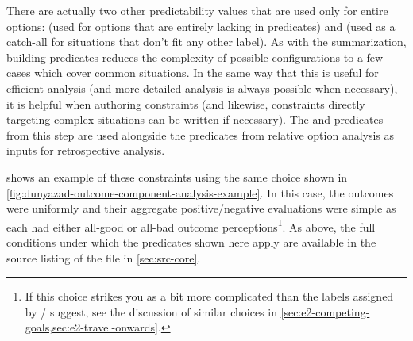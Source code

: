 \begin{enumerate}[leftmargin=1.4em]
There are actually two other predictability values that are used only for entire options:  (used for options that are entirely lacking in  predicates) and  (used as a catch-all for situations that don't fit any other label).
%
As with the  summarization, building  predicates reduces the complexity of possible  configurations to a few cases which cover common situations.
%
In the same way that this is useful for efficient analysis (and more detailed analysis is always possible when necessary), it is helpful when authoring constraints (and likewise, constraints directly targeting complex  situations can be written if necessary).
%
The  and  predicates from this step are used alongside the  predicates from relative option analysis as inputs for retrospective analysis.


 shows an example of these constraints using the same choice shown in \ref{fig:dunyazad-outcome-component-analysis-example}.
%
In this case, the outcomes were uniformly  and their aggregate positive/negative evaluations were simple as each had either all-good or all-bad outcome perceptions\footnote{%
If this choice strikes you as a bit more complicated than the labels assigned by \dunyazad/ suggest, see the discussion of similar choices in \cref{sec:e2-competing-goals,sec:e2-travel-onwards}.
}.
%
As above, the full conditions under which the predicates shown here apply are available in the source listing of the file  in \cref{sec:src-core}.



\end{enumerate}
